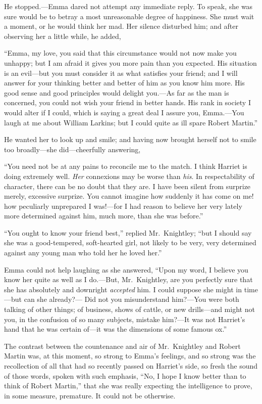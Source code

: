 He stopped.---Emma dared not attempt any immediate reply.  To speak,
she was sure would be to betray a most unreasonable degree
of happiness.  She must wait a moment, or he would think her mad.
Her silence disturbed him; and after observing her a little while,
he added,

``Emma, my love, you said that this circumstance would not now make
you unhappy; but I am afraid it gives you more pain than you expected.
His situation is an evil---but you must consider it as what satisfies
your friend; and I will answer for your thinking better and better
of him as you know him more.  His good sense and good principles would
delight you.---As far as the man is concerned, you could not wish your
friend in better hands.  His rank in society I would alter if I could,
which is saying a great deal I assure you, Emma.---You laugh at me
about William Larkins; but I could quite as ill spare Robert Martin.''

He wanted her to look up and smile; and having now brought herself
not to smile too broadly---she did---cheerfully answering,

``You need not be at any pains to reconcile me to the match.  I think
Harriet is doing extremely well.  \emph{Her} connexions may be worse than \emph{his}.
In respectability of character, there can be no doubt that they are.
I have been silent from surprize merely, excessive surprize.
You cannot imagine how suddenly it has come on me! how peculiarly
unprepared I was!---for I had reason to believe her very lately more
determined against him, much more, than she was before.''

``You ought to know your friend best,'' replied Mr.\ Knightley;
``but I should say she was a good-tempered, soft-hearted girl,
not likely to be very, very determined against any young man who told
her he loved her.''

Emma could not help laughing as she answered, ``Upon my word,
I believe you know her quite as well as I do.---But, Mr.\ Knightley,
are you perfectly sure that she has absolutely and downright
\emph{accepted} him.  I could suppose she might in time---but can she already?---%
Did not you misunderstand him?---You were both talking of other things;
of business, shows of cattle, or new drills---and might not you,
in the confusion of so many subjects, mistake him?---It was not
Harriet's hand that he was certain of---it was the dimensions of some
famous ox.''

The contrast between the countenance and air of Mr.\ Knightley and
Robert Martin was, at this moment, so strong to Emma's feelings,
and so strong was the recollection of all that had so recently
passed on Harriet's side, so fresh the sound of those words,
spoken with such emphasis, ``No, I hope I know better than to think
of Robert Martin,'' that she was really expecting the intelligence
to prove, in some measure, premature.  It could not be otherwise.

